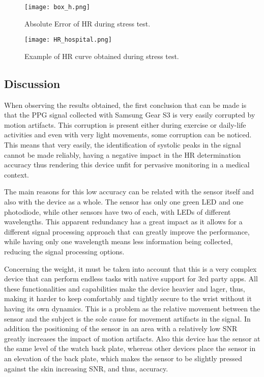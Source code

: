 \begin{figure}[!h]
	\centering
	\texttt{[image: box\_h.png]}
	\caption{Absolute Error of HR during stress test.}
	\label{figure:box_h}
\end{figure}

\begin{figure}[!h]
	\centering
	\texttt{[image: HR\_hospital.png]}
	\caption{Example of HR curve obtained during stress test.}
	\label{figure:hr_hosp}
\end{figure}

\subsection{Discussion}

When observing the results obtained, the first conclusion that can be made is that the PPG signal collected with Samsung Gear S3 is very easily corrupted by motion artifacts. This corruption is present either during exercise or daily-life activities and even with very light movements, some corruption can be noticed. This means that very easily, the identification of systolic peaks in the signal cannot be made reliably, having a negative impact in the HR determination accuracy thus rendering this device unfit for pervasive monitoring in a medical context.

The main reasons for this low accuracy can be related with the sensor itself and also with the device as a whole. The sensor has only one green LED and one photodiode, while other sensors have two of each, with LEDs of different wavelengths. This apparent redundancy has a great impact as it allows for a different signal processing approach that can greatly improve the performance, while having only one wavelength means less information being collected, reducing the signal processing options. 

Concerning the weight, it must be taken into account that this is a very complex device that can perform endless tasks with native support for 3rd party apps. All these functionalities and capabilities make the device heavier and lager, thus, making it harder to keep comfortably and tightly secure to the wrist without it having its own dynamics. This is a problem as the relative movement between the sensor and the subject is the sole cause for movement artifacts in the signal. In addition the positioning of the sensor in an area with a relatively low SNR greatly increases the impact of motion artifacts. Also this device has the sensor at the same level of the watch back plate, whereas other devices place the sensor in an elevation of the back plate, which makes the sensor to be slightly pressed against the skin increasing SNR, and thus, accuracy. 

